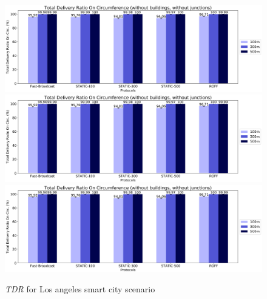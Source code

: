 	\begin{figure}[H]
		\centering
		\includegraphics[width=1.0\textwidth]{immagini/la-smart-city/b0/tdroc}
		\includegraphics[width=1.0\textwidth]{immagini/la-smart-city/b1/h0/tdroc}
		\includegraphics[width=1.0\textwidth]{immagini/la-smart-city/b1//h1/tdroc}
		\caption{\textit{TDR} for Los angeles smart city scenario}
		\label{fig:la-smart-city-tdroc}
	\end{figure}
	
